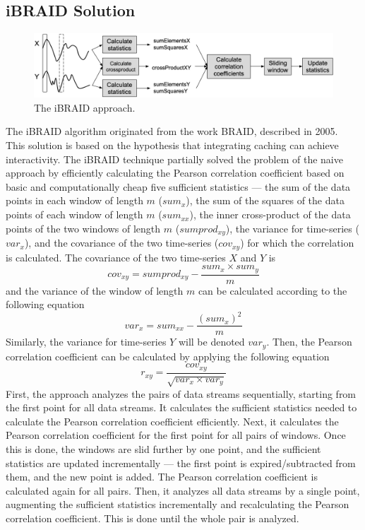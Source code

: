 \subsection{iBRAID Solution~\cite{ref2,ref3}}
\label{sec:iBRAID}
\begin{figure}[H]
\centering
    \includegraphics[width=\textwidth]{figures/ibraid.png}
    \caption{The iBRAID approach.}
    \label{fig:iBRAID}
\end{figure}
The iBRAID algorithm originated from the work BRAID, described in 2005.~\cite{ref6} This solution is based on the hypothesis that integrating caching can achieve interactivity. The iBRAID technique partially solved the problem of the naive approach by efficiently calculating the Pearson correlation coefficient based on basic and computationally cheap five sufficient statistics — the sum of the data points in each window of length $m$ ($s u m_{x}$), the sum of the squares of the data points of each window of length $m$ ($s u m_{x x}$), the inner cross-product of the data points of the two windows of length $m$ ($s u m p r o d_{x y}$), the variance for time-series ($v a r_{x}$), and the covariance of the two time-series ($c o v_{x y}$) for which the correlation is calculated. The covariance of the two time-series $X$ and $Y$ is
\begin{equation}
c o v_{x y}=s u m p r o d_{x y}-\frac{s u m_{x} \times s u m_{y}}{m}
\end{equation}
and the variance of the window of length $m$ can be calculated according to the following equation
\begin{equation}
v a r_{x}=s u m_{x x}-\frac{(s u m_{x})^{2}}{m}
\end{equation}
Similarly, the variance for time-series $Y$ will be denoted $v a r_{y}$. Then, the Pearson correlation coefficient can be calculated by applying the following equation
\begin{equation}
r_{x y}=\frac{c o v_{x y}}{\sqrt{v a r_{x} \times v a r_{y}}}
\end{equation}
First, the approach analyzes the pairs of data streams sequentially, starting from the first point for all data streams. It calculates the sufficient statistics needed to calculate the Pearson correlation coefficient efficiently. Next, it calculates the Pearson correlation coefficient for the first point for all pairs of windows. Once this is done, the windows are slid further by one point, and the sufficient statistics are updated incrementally — the first point is expired/subtracted from them, and the new point is added. The Pearson correlation coefficient is calculated again for all pairs. Then, it analyzes all data streams by a single point, augmenting the sufficient statistics incrementally and recalculating the Pearson correlation coefficient. This is done until the whole pair is analyzed.\newline

